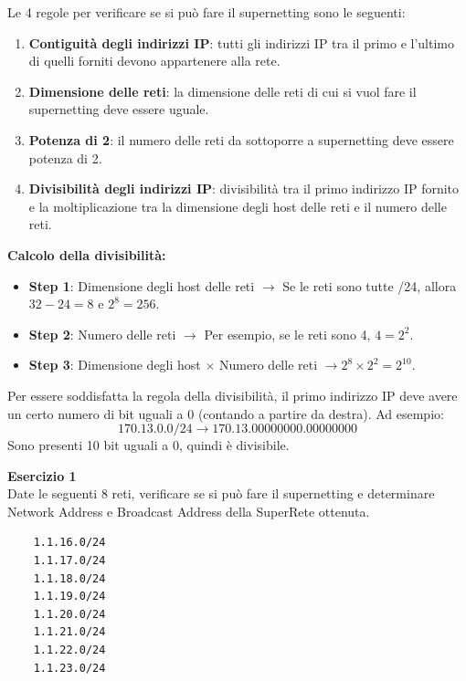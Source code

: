 \documentclass[12pt]{report}
\begin{document}
\begin{tcolorbox}[breakable, title={Esempio di Supernetting}]
	Le 4 regole per verificare se si può fare il supernetting sono le seguenti:
	\begin{enumerate}
		\item \textbf{Contiguità degli indirizzi IP}: tutti gli indirizzi IP tra il primo e l’ultimo di quelli forniti devono appartenere alla rete.
		\item \textbf{Dimensione delle reti}: la dimensione delle reti di cui si vuol fare il supernetting deve essere uguale.
		\item \textbf{Potenza di 2}: il numero delle reti da sottoporre a supernetting deve essere potenza di 2.
		\item \textbf{Divisibilità degli indirizzi IP}: divisibilità tra il primo indirizzo IP fornito e la moltiplicazione tra la dimensione degli host delle reti e il numero delle reti.
	\end{enumerate}
	
	\textbf{Calcolo della divisibilità:}
	\begin{itemize}
		\item \textbf{Step 1}: Dimensione degli host delle reti $\rightarrow$ Se le reti sono tutte /24, allora $32-24=8$ e $2^8=256$.
		\item \textbf{Step 2}: Numero delle reti $\rightarrow$ Per esempio, se le reti sono 4, $4=2^2$.
		\item \textbf{Step 3}: Dimensione degli host $\times$ Numero delle reti $\rightarrow 2^8 \times 2^2 = 2^{10}$.
	\end{itemize}
	
	Per essere soddisfatta la regola della divisibilità, il primo indirizzo IP deve avere un certo numero di bit uguali a 0 (contando a partire da destra). Ad esempio:
	\[
	170.13.0.0/24 \rightarrow 170.13.00000000.00000000
	\]
	Sono presenti 10 bit uguali a 0, quindi è divisibile.
	
	\vspace{0.4cm}
	\textbf{Esercizio 1} \\
	Date le seguenti 8 reti, verificare se si può fare il supernetting e determinare Network Address e Broadcast Address della SuperRete ottenuta.
	\begin{verbatim}
	1.1.16.0/24
	1.1.17.0/24
	1.1.18.0/24
	1.1.19.0/24
	1.1.20.0/24
	1.1.21.0/24
	1.1.22.0/24
	1.1.23.0/24
	\end{verbatim}
	

\end{tcolorbox}
\end{document}
